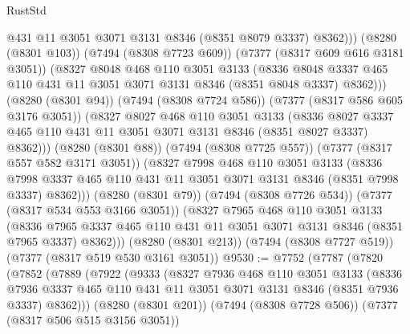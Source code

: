 \begin{lexlean}{RustStd}
\begin{coremodule}
{\begin{coremodule}
{{{{{{{{{{{{{{{{{{{{{{{{{{{{{{{{                  @431
                  @11
                  @3051
                  @3071
                  @3131
                  @8346
                  (@8351 @8079 @3337)
                  @8362)))
            (@8280 (@8301 @103))
            (@7494 (@8308 @7723 @609))
            (@7377 (@8317 @609 @616 @3181 @3051))
            (@8327
              @8048
              @468
              @110
              @3051
              @3133
              (@8336
                @8048
                @3337
                @465
                @110
                @431
                @11
                @3051
                @3071
                @3131
                @8346
                (@8351 @8048 @3337)
                @8362)))
          (@8280 (@8301 @94))
          (@7494 (@8308 @7724 @586))
          (@7377 (@8317 @586 @605 @3176 @3051))
          (@8327
            @8027
            @468
            @110
            @3051
            @3133
            (@8336
              @8027
              @3337
              @465
              @110
              @431
              @11
              @3051
              @3071
              @3131
              @8346
              (@8351 @8027 @3337)
              @8362)))
        (@8280 (@8301 @88))
        (@7494 (@8308 @7725 @557))
        (@7377 (@8317 @557 @582 @3171 @3051))
        (@8327
          @7998
          @468
          @110
          @3051
          @3133
          (@8336 @7998 @3337 @465 @110 @431 @11 @3051 @3071 @3131 @8346 (@8351 @7998 @3337) @8362)))
      (@8280 (@8301 @79))
      (@7494 (@8308 @7726 @534))
      (@7377 (@8317 @534 @553 @3166 @3051))
      (@8327
        @7965
        @468
        @110
        @3051
        @3133
        (@8336 @7965 @3337 @465 @110 @431 @11 @3051 @3071 @3131 @8346 (@8351 @7965 @3337) @8362)))
    (@8280 (@8301 @213))
    (@7494 (@8308 @7727 @519))
    (@7377 (@8317 @519 @530 @3161 @3051))
@9530 := @7752
    (@7787
      (@7820
        (@7852
          (@7889
            (@7922
              (@9333
                (@8327
                  @7936
                  @468
                  @110
                  @3051
                  @3133
                  (@8336
                    @7936
                    @3337
                    @465
                    @110
                    @431
                    @11
                    @3051
                    @3071
                    @3131
                    @8346
                    (@8351 @7936 @3337)
                    @8362)))
              (@8280 (@8301 @201))
              (@7494 (@8308 @7728 @506))
              (@7377 (@8317 @506 @515 @3156 @3051))
}}}}}}}}}}}}}}}}}}}}}}}}}}}}}}}}
\end{coremodule}}
\end{coremodule}
\end{lexlean}
